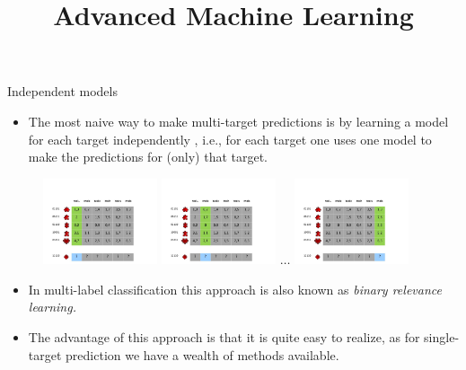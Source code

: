 \documentclass[11pt,compress,t,notes=noshow, xcolor=table]{beamer}
\title{Advanced Machine Learning}
\date{}
\begin{document}



\sloppy


\begin{frame}{Independent models}
%	
	\begin{itemize}
		\item 	The most naive way to make multi-target predictions is by learning a model for each target independently , i.e., for each target one uses one model to make the predictions for (only) that target.
%	
	\end{itemize}

	\begin{figure}
		\centering
		\includegraphics[width=0.3\textwidth,trim = 0 0 100 100,clip]{figure/Slide13}
		\includegraphics[width=0.3\textwidth,trim = 0 0 100 100,clip]{figure/Slide14} 
%		
		$\ldots$
%		
		\includegraphics[width=0.3\textwidth,trim = 0 0 100 100,clip]{figure/Slide15}
	\end{figure}
%	
%
	\begin{itemize}
%		
		\item In multi-label classification this approach is also known as \emph{binary relevance learning.}
		\item The advantage of this approach is that it is quite easy to realize, as for single-target prediction we have a wealth of methods available.
	\end{itemize}

\end{frame}
\end{document}
